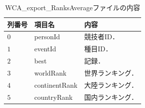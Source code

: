 \documentclass{article}
\begin{document}
  \begin{table}[h]
    \centering
    \caption{WCA\_export\_RanksAverageファイルの内容}
    \label{table:ranksAverage}
    \begin{tabular}{l|l|l}
      \hline
      列番号 & 項目名 & 内容 \\
      \hline \hline
      $ 0 $ & personId & 競技者ID． \\
      $ 1 $ & eventId & 種目ID． \\
      $ 2 $ & best & 記録． \\
      $ 3 $ & worldRank & 世界ランキング． \\
      $ 4 $ & continentRank & 大陸ランキング． \\
      $ 5 $ & countryRank & 国内ランキング． \\
      \hline
    \end{tabular}
  \end{table}
\end{document}
